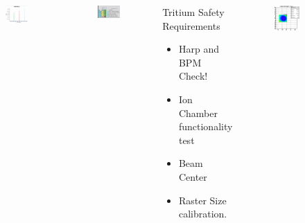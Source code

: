 \documentclass{beamer}
\begin{document}
\begin{frame}
\begin{columns}[t]
	
	\begin{figure}
		\includegraphics[width=4.5cm]{../images/harpscan1}
	\end{figure}
	
	\vspace{-10pt}
	\begin{figure}
		\includegraphics[width=4.5cm]{../images/ION}
	\end{figure}
	\vspace{-20pt}
	\begin{block}{Tritium Safety Requirements}
		\begin{itemize}
			\item Harp and BPM Check!
			\item Ion Chamber functionality test
			\item Beam Center
			\item Raster Size calibration. 
		\end{itemize}	
	\end{block}	
	\vspace{-10pt}
	\begin{figure}
		\includegraphics[width=5cm]{../images/spot}
	\end{figure}	
\end{columns}
\end{frame}
\end{document}
